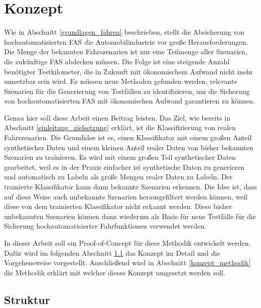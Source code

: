 
\chapter{Konzept}
\label{konzept}

Wie in Abschnitt \ref{grundlagen_fahren} beschrieben, stellt die Absicherung von hochautomatisierten \ac{FAS} die Automobilindustrie vor große Herausforderungen. Die Menge der bekannten Fahrszenarien ist nur eine Teilmenge aller Szenarien, die zukünftige \ac{FAS} abdecken müssen. Die Folge ist eine steigende Anzahl benötigter Testkilometer, die in Zukunft mit ökonomischem Aufwand nicht mehr umsetzbar sein wird. Es müssen neue Methoden gefunden werden, relevante Szenarien für die Generierung von Testfällen zu identifizieren, um die Sicherung von hochautomatisierten \ac{FAS} mit ökonomischen Aufwand garantieren zu können.

Genau hier soll diese Arbeit einen Beitrag leisten. Das Ziel, wie bereits in Abschnitt \ref{einleitung_zielsetzung} erklärt, ist die Klassifizierung von realen Fahrszenarien. Die Grundidee ist es, einen Klassifikator mit einem großen Anteil synthetischer Daten und einem kleinen Anteil realer Daten von bisher bekannten Szenarien zu trainieren. Es wird mit einem großen Teil synthetischer Daten gearbeitet, weil es in der Praxis einfacher ist synthetische Daten zu generieren und automatisch zu Labeln als große Mengen realer Daten zu Labeln. Der trainierte Klassifikator kann dann bekannte Szenarien erkennen. Die Idee ist, dass auf diese Weise auch unbekannte Szenarien herausgefiltert werden können, weil diese von dem trainierten Klassifikator nicht erkannt werden. Diese bisher unbekannten Szenarien können dann wiederum als Basis für neue Testfälle für die Sicherung hochautomatisierter Fahrfunktionen verwendet werden.

In dieser Arbeit soll ein Proof-of-Concept für diese Methodik entwickelt werden. Dafür wird im folgenden Abschnitt \ref{konzept_struktur} das Konzept im Detail und die Vorgehensweise vorgestellt. Anschließend wird in Abschnitt \ref{konzept_methodik} die Methodik erklärt mit welcher dieses Konzept umgesetzt werden soll.


\section{Struktur}
\label{konzept_struktur}

